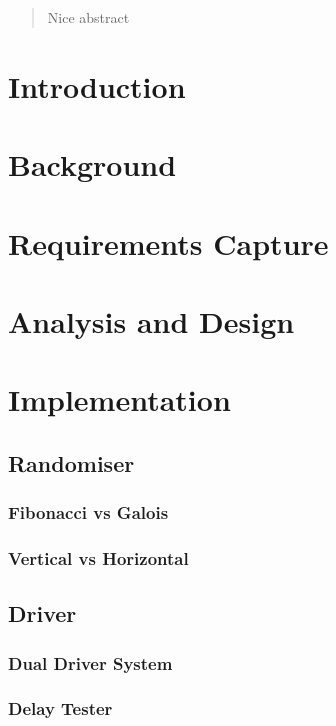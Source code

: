 \documentclass[12pt]{article}
\begin{document}


\setcounter{tocdepth}{2}
\tableofcontents

\newpage

\begin{abstract}
  Nice abstract
\end{abstract}

\section{Introduction}

\section{Background}

\section{Requirements Capture}

\section{Analysis and Design}

\section{Implementation}

\subsection{Randomiser}
\subsubsection{Fibonacci vs Galois}
\subsubsection{Vertical vs Horizontal}

\subsection{Driver}
\subsubsection{Dual Driver System}
\subsubsection{Delay Tester}
\end{document}
